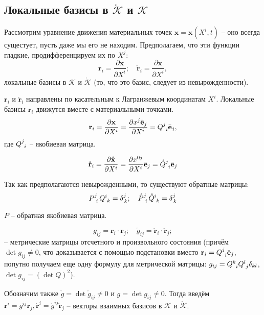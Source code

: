 \subsection{Локальные базисы в $\mathring{\mathcal{K}}$ и $\mathcal{K}$}

Рассмотрим уравнение движения материальных точек $\mathbf{x} = \mathbf{x} (X^i, t)$ -- оно всегда
сущестует, пусть даже мы его не находим. Предполагаем, что эти функции гладкие, продифференцируем
их по $X^j$:
\[
  \mathbf{r}_i = \frac{\partial \mathbf{x}}{\partial X^i}; \quad
  \mathring{\mathbf{r}}_i = \frac{\partial \mathring{\mathbf{x}}}{\partial X^i},
\]
локальные базисы в $\mathcal{K}$ и $\mathring{\mathcal{K}}$ (то, что это базис, следует из
невырожденности).

\begin{wrapfigure}{r}{0.5\textwidth}
	\centering
	
\end{wrapfigure}

$\mathbf{r}_i$ и $\mathring{\mathbf{r}}_i$ направлены по касательным к Лагранжевым координатам $X^i$. 
Локальные базисы $\mathbf{r}_i$ движутся вместе с материальными точками. 
\[
  \mathbf{r}_i
  = \frac{\partial \mathbf{x}}{\partial X^i}
  = \frac{\partial x^j \bar{\mathbf{e}}_j}{\partial X^i}  
  = \tensor{Q}{^j_i} \bar{\mathbf{e}}_j,
\]
где $\tensor{Q}{^j_i}$ -- якобиевая матрица.

\[
  \mathring{\mathbf{r}}_i = \frac{\partial \mathring{\mathbf{x}}}{\partial X^i}
  = \frac{\partial x^{0j}}{\partial X^i} \bar{\mathbf{e}}_j
  = \tensor{\mathring{Q}}{^j_i} \bar{\mathbf{e}}_j
\]

Так как предполагаются невырожденными, то существуют обратные матрицы:
\[
  \tensor{P}{^j_i} \tensor{Q}{^i_k} = \delta^j_{\, k}; \quad
  \tensor{\mathring{P}}{^j_i} \tensor{\mathring{Q}}{^i_k} = \delta^j_{\, k}
\]

$P$ -- обратная якобиевая матрица.

\[
  g_{ij} = \mathbf{r}_i \cdot \mathbf{r}_j; 
  \quad
  \mathring{g}_{ij} = \mathring{\mathbf{r}}_i \cdot \mathring{\mathbf{r}}_j;
\]
-- метрические матрицы отсчетного и произвольного состояния (причём $\det g_{ij} \neq 0$, что
доказывается с помощью подстановки вместо $\mathbf{r}_i = \tensor{Q}{^j_i} \bar{\mathbf{e}}_j$, попутно
получаем еще одну формулу для метрической матрицы: 
$g_{ij} = \tensor{Q}{^k_i} \tensor{Q}{^l_j} \delta_{kl}$, $\det g_{ij} = (\det Q )^2$).

Обозначим также $\mathring{g} = \det \mathring{g}_{ij} \neq 0$ и $g = \det g_{ij} \neq 0$.
Тогда введём $\mathbf{r}^i  = g^{ij} \mathbf{r}_j, \mathring{\mathbf{r}}^i = \mathring{g}^{ij}
\mathring{\mathbf{r}}_j$ --
векторы взаимных базисов в $\mathcal{K}$ и $\mathring{\mathcal{K}}$.

